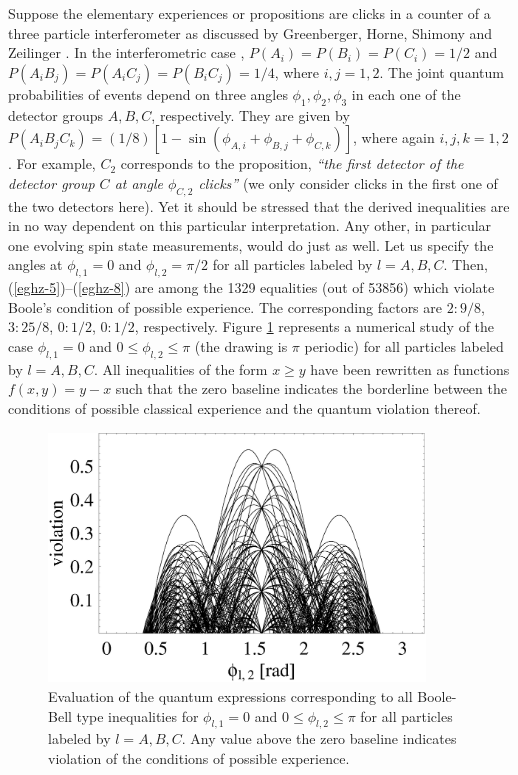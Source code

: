 Suppose the elementary experiences or propositions are
clicks in a counter of a three particle interferometer as  discussed by
Greenberger, Horne, Shimony and Zeilinger \cite{ghsz}.
In the interferometric case \cite{ghsz},
$P(A_i)=P(B_i)=P(C_i)=1/2$ and
$P(A_iB_j)=P(A_iC_j)=P(B_iC_j)=1/4$, where $i,j=1,2$.
The joint quantum probabilities of events depend on three angles
$\phi_1,\phi_2,\phi_3$ in each one of the detector groups $A,B,C$, respectively.
They are given by
$
P(A_iB_jC_k)=
(1/8)[1-\sin (\phi_{A,i}+\phi_{B,j}+\phi_{C,k})]
$, where again $i,j,k =1,2$.
For example, $C_2$ corresponds to the  proposition,
{\em ``the first detector of the detector group $C$ at angle $\phi_{C,2}$ clicks''}
(we only consider clicks in the first one of the two detectors here).
Yet it should be stressed that the derived inequalities are in no way dependent
on this particular interpretation. Any other, in particular one evolving spin state measurements,
would do just as well.
Let us specify the angles at $\phi_{l,1}=0$ and $\phi_{l,2}=\pi /2$
for all particles labeled by $l=A,B,C$.
Then,
(\ref{eghz-5})--(\ref{eghz-8})
are among the  1329 equalities (out of 53856) which
violate  Boole's condition of possible experience.
The corresponding
factors are
 $2 :  9/8$,
 $3 :  25/8$,
 $0 :  1/2$,
 $0 :  1/2$,
respectively.
Figure   \ref{2000-poly-f3} represents a numerical study of the  case
$\phi_{l,1}=0$ and
$0\le \phi_{l,2}  \le \pi$ (the drawing is $\pi$ periodic)
for all particles labeled by $l=A,B,C$.
All inequalities of the form $x\ge y$ have been rewritten as functions
$f(x,y)=y-x$ such that the zero baseline indicates
the borderline between the conditions of possible classical experience and
the quantum violation thereof.
\begin{figure}
 \includegraphics[width=10cm]{2000-poly-f1.eps}
 \caption{Evaluation of the quantum expressions corresponding to all
Boole-Bell type inequalities for
$\phi_{l,1}=0$ and
$0\le \phi_{l,2}  \le \pi$
for all particles labeled by $l=A,B,C$.
Any value above the zero baseline indicates violation of the conditions
of possible experience.}
\label{2000-poly-f3}
\end{figure}
